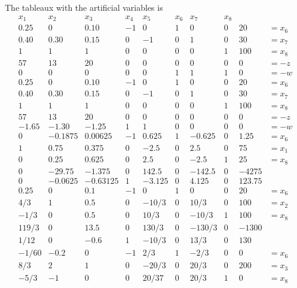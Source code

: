 \documentclass{homework}
\begin{document}
\begin{enumerate}
		The tableaux with the artificial variables is \[
			\begin{array}{ccccc|ccc|cl}
				x_1 & x_2 & x_3 & x_4 & x_5 & x_6 & x_7 & x_8 & & \\
				\hline
				0.25 & 0 & 0.10 & -1 & 0 & 1 & 0 & 0 & 20 & =x_6 \\
				0.40 & 0.30 & 0.15 & 0 & -1 & 0 & 1 & 0 & 30 & =x_7\\
				1 & 1 & 1 & 0 & 0 & 0 & 0 & 1 & 100 & = x_8\\
				\hline
				57 & 13 & 20 & 0 & 0 & 0 & 0 & 0 & 0 & = -z \\
				0 &  0 & 0 & 0 & 0 & 1 & 1 & 1 & 0 & = -w \\
				\hline \hline
				0.25 & 0 & 0.10 & -1 & 0 & 1 & 0 & 0 & 20 & =x_6 \\
				\boxed{0.40} & 0.30 & 0.15 & 0 & -1 & 0 & 1 & 0 & 30 & =\boxed{x_7}\\
				1 & 1 & 1 & 0 & 0 & 0 & 0 & 1 & 100 & = x_8\\
				\hline
				57 & 13 & 20 & 0 & 0 & 0 & 0 & 0 & 0 & = -z \\
				\boxed{-1.65} & -1.30 & -1.25 & 1 & 1 & 0 & 0 & 0 & 0 & = -w \\
				\hline \hline
				0 & -0.1875 & 0.00625 & -1 & 0.625 & 1 & -0.625 & 0 & 1.25 & = x_6\\
				1 & \boxed{0.75} & 0.375 & 0 & -2.5 & 0 & 2.5 & 0 & 75 & = \boxed{x_1} \\
				0 & 0.25 & 0.625 & 0 & 2.5 & 0 & -2.5 & 1 & 25 & =x_8 \\
				\hline
				0 & -29.75 & -1.375 & 0 & 142.5 & 0 & -142.5 & 0 & -4275 \\
				0 & \boxed{-0.0625} & -0.63125 & 1 & -3.125 & 0 & 4.125 & 0 & 123.75 \\
				\hline \hline
				0.25 & 0 & 0.1 & -1 & 0 & 1 & 0 & 0 & 20 & = x_6\\
				4/3 & 1 & \boxed{0.5} & 0 & -10/3 & 0 & 10/3 & 0 & 100 & = \boxed{x_2}\\
				-1/3 & 0 & 0.5 & 0 & 10/3 & 0 & -10/3 & 1 & 100 & = x_8\\
				\hline
				119/3 & 0 & 13.5 & 0 & 130/3 & 0 & -130/3 &  0 & -1300 \\
				1/12 & 0 & \boxed{-0.6} & 1 & -10/3 & 0 & 13/3 & 0 & 130 \\
				\hline \hline
				-1/60 & -0.2 & 0 & -1 & \boxed{2/3} & 1 & -2/3 & 0 & 0 & = \boxed{x_6}\\
				8/3 & 2 & 1 & 0 & -20/3 & 0 & 20/3 & 0 & 200 & = x_3\\
				-5/3 & -1 & 0 & 0 & 20/37  & 0 & 20/3 & 1 & 0 & = x_8\\

\end{array}\]
\end{enumerate}
\end{document}
